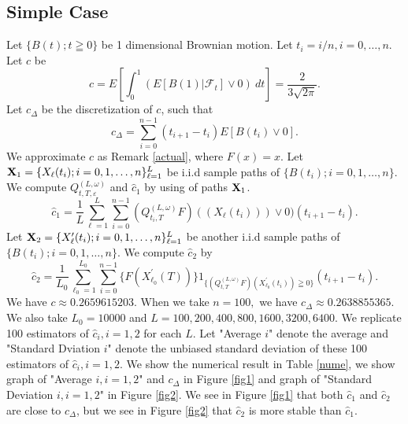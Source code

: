 \documentclass[12pt]{article}
\begin{document}
\subsection{Simple Case}
Let $\{B(t); t\geqq 0\} $ be 1 dimensional Brownian motion.
Let $t_i = i/n, i=0,\ldots, n.$ Let $c$ be
$$c=E [\int_0^1( E[B(1)|\mathcal{F}_t]\vee0 )\ dt ]=\frac{2}{3 \sqrt{2\pi}}.$$
Let $c_{\Delta}$ be the discretization of $c$, such that
$$
c_{\Delta}=\sum_{i=0}^{n-1}(t_{i+1}-t_i)E[B(t_i)\vee0].
$$
We approximate $c$  as Remark \ref{actual}, where $F(x) =x.$ Let
${\bf X}_1 = \{X_{\ell }(t_i); i=0,1,\ldots,n \}_{\ell=1}^L$
be i.i.d sample paths of $\{B(t_i); i=0,1,\ldots,n\} $.
We compute
 $Q_{t,T,\varepsilon}^{(L,\omega)}$ and $\hat{c}_1$ by using of paths ${\bf X}_1$.
$$\hat{c}_1=\frac{1}{L} \sum_{\ell=1}^L \sum_{i=0}^{n-1} (Q_{t_i,T}^{(L,\omega)}F)((X_{\ell}(t_i)))\vee0)(t_{i+1}-t_i). $$
Let ${\bf X}_2 = \{X'_{\ell }(t_i); i=0,1,\ldots,n \}_{\ell=1}^L$
be another i.i.d sample paths of $\{B(t_i); i=0,1,\ldots,n\} $.
We compute $\hat{c}_2$ by 
 $$\hat{c}_2= \frac{1}{L_0} \sum_{\ell_0=1}^{L_0} \sum_{i=0}^{n-1} \{ F(X_{\ell_0}^{'}(T))\}
 1_{\{(Q_{t,T}^{(L,\omega)}F)(X^{'}_{\ell_0}(t_i)) \geqq 0\}}(t_{i+1}-t_i).$$ 
We have $c\approx 0.2659615203.$ When we take $n = 100,$ we have $c_{\Delta}\approx 0.2638855365.$ 
We also take $L_0=10000$ and $L=100, 200, 400, 800, 1600, 3200, 6400.$ 
We replicate 100 estimators of $\hat{c}_i, i=1,2$ for each $L$. Let "Average $i$" denote the average and "Standard Dviation $i$" denote
 the unbiased standard deviation of these 100 estimators of $\hat{c}_i, i=1,2.$ We show the numerical result in Table \ref{nume}, 
we show graph of "Average $i, i = 1,2$" and $c_{\Delta}$ in Figure \ref{fig1} and graph of "Standard Deviation $i, i=1,2$" in Figure \ref{fig2}.
\noindent 
We see in Figure \ref{fig1} that both $\hat{c}_1$ and $\hat{c}_2$ are close to $c_{\Delta}$,
but we see in Figure \ref{fig2} that $\hat{c}_2$ is more stable than $\hat{c}_1.$
\\
\end{document}
